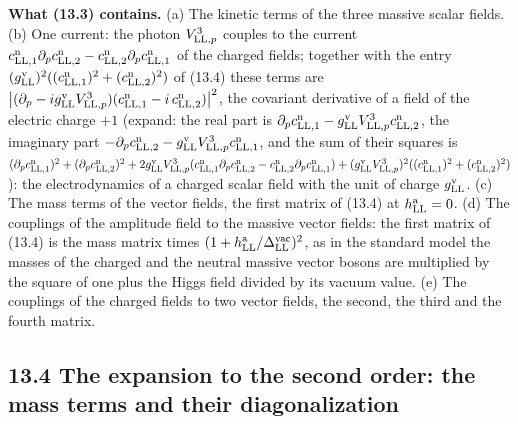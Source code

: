 \documentclass[
  10pt,
]{article}
\begin{document}
\textbf{What (13.3) contains.} (a) The kinetic terms of the three
massive scalar fields. (b) One current: the photon \(V^3_{{\rm LL},p}\)
couples to the current
\(c^{\rm n}_{{\rm LL},1}\partial_pc^{\rm n}_{{\rm LL},2}-c^{\rm n}_{{\rm LL},2}\partial_pc^{\rm n}_{{\rm LL},1}\)
of the charged fields; together with the entry
\((g^{\rm v}_{\rm LL})^2((c^{\rm n}_{{\rm LL},1})^2+(c^{\rm n}_{{\rm LL},2})^2)\)
of (13.4) these terms are
\(\big\lvert(\partial_p-ig^{\rm v}_{\rm LL}V^3_{{\rm LL},p})(c^{\rm n}_{{\rm LL},1}-i\,c^{\rm n}_{{\rm LL},2})\big\rvert^2\),
the covariant derivative of a field of the electric charge \(+1\)
(expand: the real part is
\(\partial_pc^{\rm n}_{{\rm LL},1}-g^{\rm v}_{\rm LL}V^3_{{\rm LL},p}c^{\rm n}_{{\rm LL},2}\),
the imaginary part
\(-\partial_pc^{\rm n}_{{\rm LL},2}-g^{\rm v}_{\rm LL}V^3_{{\rm LL},p}c^{\rm n}_{{\rm LL},1}\),
and the sum of their squares is
\((\partial_pc^{\rm n}_{{\rm LL},1})^2+(\partial_pc^{\rm n}_{{\rm LL},2})^2+2g^{\rm v}_{\rm LL}V^3_{{\rm LL},p}(c^{\rm n}_{{\rm LL},1}\partial_pc^{\rm n}_{{\rm LL},2}-c^{\rm n}_{{\rm LL},2}\partial_pc^{\rm n}_{{\rm LL},1})+(g^{\rm v}_{\rm LL}V^3_{{\rm LL},p})^2((c^{\rm n}_{{\rm LL},1})^2+(c^{\rm n}_{{\rm LL},2})^2)\)):
the electrodynamics of a charged scalar field with the unit of charge
\(g^{\rm v}_{\rm LL}\). (c) The mass terms of the vector fields, the
first matrix of (13.4) at \(h^{\rm a}_{\rm LL}=0\). (d) The couplings of
the amplitude field to the massive vector fields: the first matrix of
(13.4) is the mass matrix times
\((1+h^{\rm a}_{\rm LL}/\Delta^{\rm vac}_{\rm LL})^2\), as in the
standard model the masses of the charged and the neutral massive vector
bosons are multiplied by the square of one plus the Higgs field divided
by its vacuum value. (e) The couplings of the charged fields to two
vector fields, the second, the third and the fourth matrix.

\hypertarget{the-expansion-to-the-second-order-the-mass-terms-and-their-diagonalization}{%
\subsection{13.4 The expansion to the second order: the mass terms and
their
diagonalization}\label{the-expansion-to-the-second-order-the-mass-terms-and-their-diagonalization}}
\end{document}
